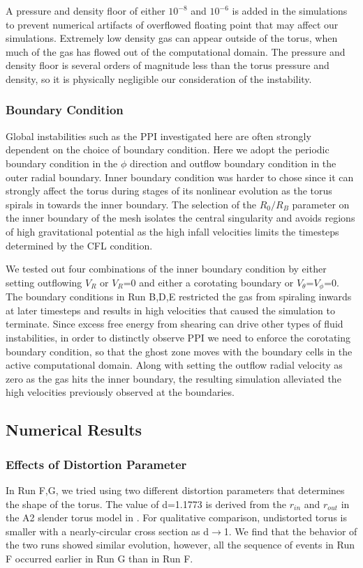 \documentclass[iop,revtex4]{emulateapj}
\begin{document}
\par A pressure and density floor of either $10^{-8}$ and $10^{-6}$ is added in the simulations to prevent numerical artifacts of overflowed floating point that may affect our simulations. Extremely low density gas can appear outside of the torus, when much of the gas has flowed out of the computational domain. The pressure and density floor is several orders of magnitude less than the torus pressure and density, so it is physically negligible our consideration of the instability.
\subsubsection{Boundary Condition\label{sec:BC}}
\par Global instabilities such as the \ac{PPI} investigated here are often strongly dependent on the choice of boundary condition. Here we adopt the periodic boundary condition in the $\phi$ direction and outflow boundary condition in the outer radial boundary. Inner boundary condition was harder to chose since it can strongly affect the torus during stages of its nonlinear evolution as the torus spirals in towards the inner boundary. The selection of the $R_0/R_B$ parameter on the inner boundary of the mesh isolates the central singularity and avoids regions of high gravitational potential as the high infall velocities limits the timesteps determined by the \ac{CFL} condition. 
\par We tested out four combinations of the inner boundary condition by either setting outflowing $V_R$ or $V_R$=0 and either a corotating boundary or $V_\theta$=$V_\phi$=0. The boundary conditions in Run B,D,E restricted the gas from spiraling inwards at later timesteps and results in high velocities that caused the simulation to terminate. Since excess free energy from shearing can drive other types of fluid instabilities, in order to distinctly observe \ac{PPI} we need to enforce the corotating boundary condition, so that the ghost zone moves with the boundary cells in the active computational domain.  Along with setting the outflow radial velocity as zero as the gas hits the inner boundary, the resulting simulation alleviated the high velocities previously observed at the boundaries. 
\subsection{Numerical Results}
\subsubsection{Effects of Distortion Parameter}
\par In Run F,G, we tried using two different distortion parameters that determines the shape of the torus. The value of d=1.1773 is derived from the $r_{in}$ and $r_{out}$ in the A2 slender torus model in \cite{Hawley:1991A}. For qualitative comparison, undistorted torus is smaller with a nearly-circular cross section as d$\rightarrow$1. We find that the behavior of the two runs showed similar evolution, however, all the sequence of events in Run F occurred earlier in Run G than in Run F.
\end{document}
